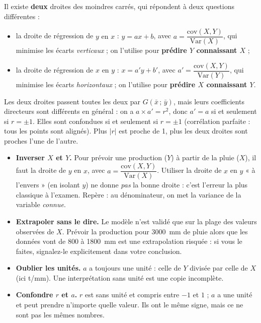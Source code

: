 \documentclass[11pt]{article}
\newcommand{\cle}[1]{{\popxbold\color{popdark}#1}}
\begin{document}
\begin{definition}
Il existe \textbf{deux} droites des moindres carrés, qui répondent à deux questions différentes :
\begin{itemize}
  \item la droite de régression de \cle{$y$ en $x$} : $y = ax + b$, avec $a = \dfrac{\mathrm{cov}(X,Y)}{\mathrm{Var}(X)}$, qui minimise les écarts \emph{verticaux} ; on l'utilise pour \textbf{prédire $Y$ connaissant $X$} ;
  \item la droite de régression de \cle{$x$ en $y$} : $x = a'y + b'$, avec $a' = \dfrac{\mathrm{cov}(X,Y)}{\mathrm{Var}(Y)}$, qui minimise les écarts \emph{horizontaux} ; on l'utilise pour \textbf{prédire $X$ connaissant $Y$}.
\end{itemize}
Les deux droites passent toutes les deux par $G(\bar{x}\,;\,\bar{y})$, mais leurs coefficients directeurs sont différents en général : on a $a \times a' = r^2$, donc $a' = a$ si et seulement si $r = \pm 1$. Elles sont confondues si et seulement si $r = \pm 1$ (corrélation parfaite : tous les points sont alignés). Plus $|r|$ est proche de 1, plus les deux droites sont proches l'une de l'autre.
\end{definition}

\begin{attention}
\begin{itemize}
  \item \textbf{Inverser $X$ et $Y$.} Pour prévoir une production ($Y$) à partir de la pluie ($X$), il faut la droite de $y$ en $x$, avec $a = \dfrac{\mathrm{cov}(X,Y)}{\mathrm{Var}(X)}$. Utiliser la droite de $x$ en $y$ « à l'envers » (en isolant $y$) ne donne \emph{pas} la bonne droite : c'est l'erreur la plus classique à l'examen. Repère : au dénominateur, on met la variance de la variable \emph{connue}.
  \item \textbf{Extrapoler sans le dire.} Le modèle n'est validé que sur la plage des valeurs observées de $X$. Prévoir la production pour \SI{3000}{mm} de pluie alors que les données vont de 800 à \SI{1800}{mm} est une extrapolation risquée : si vous le faites, signalez-le explicitement dans votre conclusion.
  \item \textbf{Oublier les unités.} $a$ a toujours une unité : celle de $Y$ divisée par celle de $X$ (ici t/mm). Une interprétation sans unité est une copie incomplète.
  \item \textbf{Confondre $r$ et $a$.} $r$ est sans unité et compris entre $-1$ et $1$ ; $a$ a une unité et peut prendre n'importe quelle valeur. Ils ont le même signe, mais ce ne sont pas les mêmes nombres.
\end{itemize}
\end{attention}
\end{document}
